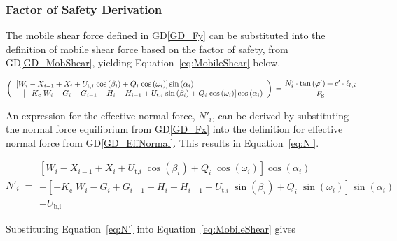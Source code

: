 \documentclass[12pt]{article}
\newcommand{\dref}[1]{GD\ref{#1}}
\begin{document}

\subsubsection*{Factor of Safety Derivation}

The mobile shear force defined in \dref{GD_Fy} can be substituted into the 
definition of mobile shear force based on the factor of safety, from 
\dref{GD_MobShear}, yielding Equation~\ref{eq:MobileShear} below.

\begin{equation} \label{eq:MobileShear}
\left( \begin{array}{l} \left[
W_{i} -X_{i-1} + X_{i} +
{U_{\text{t,}i}}\;{\cos\left(\beta_{i}\right)} +
Q_{i}\;{\cos\left(\omega_{i}\right)}
\right]\sin\left(\alpha_{i}\right) \\ - \left[
{-K_{\text{c}}}\;{W_{i}} - G_{i} + G_{i-1}
- H_{i} + H_{i-1} +
{U_{\text{t,}i}}\;{\sin\left(\beta_{i}\right)} +
Q_{i}\;{\cos\left(\omega_{i}\right)}
\right]\cos\left(\alpha_{i}\right) \end{array} \right)\\ = \frac { 
N'_{i} \cdot \tan\left( \varphi'
	\right) + c' \cdot \ell_{b,i} }{F_\text{S}}
\end{equation}

\noindent An expression for the effective normal force, $N'_i$, can be derived 
by substituting the normal force equilibrium from \dref{GD_Fx} into the 
definition for effective normal force from \dref{GD_EffNormal}. This results in 
Equation~\ref{eq:N'}.
	
\begin{equation} \label{eq:N'}
N'_{i} \; = \begin{array}{l}
\left[ W_{i} - X_{i-1} + X_{i} +
{U_{\text{t,}i}}\;{\cos\left(\beta_{i}\right)} +
Q_{i}\;{\cos\left(\omega_{i}\right)}
\right]\cos\left(\alpha_{i}\right) \\ + \left[
{-K_{\text{c}}}\;{W_{i}} - G_{i} + G_{i-1} -
H_{i} + H_{i-1} +
{U_{\text{t,}i}}\;{\sin\left(\beta_{i}\right)} +
Q_{i}\;{\sin\left(\omega_{i}\right)}
\right]\sin\left(\alpha_{i}\right) \\ -
U_{\text{b,i}} \end{array}
\end{equation}

\noindent Substituting Equation~\ref{eq:N'} into Equation~\ref{eq:MobileShear} 
gives
\end{document}
